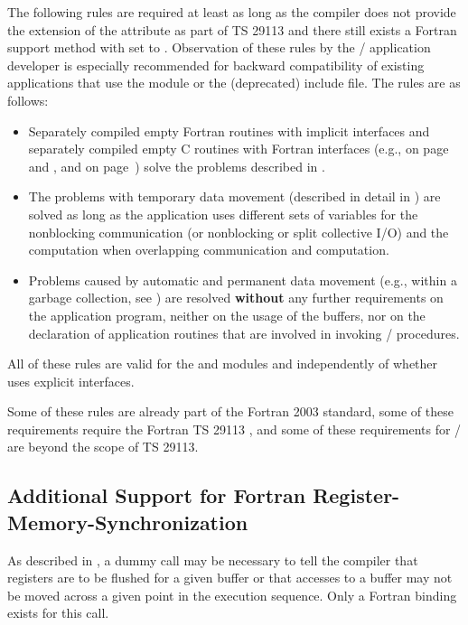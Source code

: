 The following rules are required at least as long as the compiler does not provide
the extension of the  attribute as part of
TS 29113
and there still exists a Fortran support method with
 set to .
Observation of these rules by the \MPI/ application developer is
especially recommended for
backward compatibility of existing applications that
use the  module or the (deprecated)  include file.
The rules are as follows:
\begin{itemize}
\item
  Separately compiled empty Fortran routines with implicit interfaces
  and separately compiled empty C routines with  Fortran interfaces
  (e.g., 
   on page~\pageref{sec:f90-problems:code-movements:f-sync-reg}
   and ,
   and 
   on page~\pageref{sec:f90-problems:code-movements:dd})
  solve the problems described in
  .
\item
  The problems with temporary data movement
  (described in detail in )
  are solved as long as the application uses different sets
  of variables for
  the nonblocking communication (or nonblocking or split collective I/O)
  and the computation when overlapping communication and computation.
\item
  Problems caused by automatic and permanent data movement
  (e.g., within a garbage collection, see
  )
  are resolved \textbf{without} any further requirements
  on the application program, neither on the usage of the buffers,
  nor on the declaration of application routines that are involved
  in invoking \MPI/ procedures.
\end{itemize}
All of these rules are valid
for the  and 
modules and
independently of whether
 uses explicit interfaces.
\begin{implementors}
   Some of these rules are already part of the Fortran 2003 standard,
   some of these requirements require
   the Fortran TS 29113
   \cite{fortran2008:ts29113-interop},
   and
   some of these requirements for \MPI/ are beyond the scope of TS 29113.
\end{implementors}


\subsection{Additional Support for Fortran Register-Memory-Synchronization}
\label{f90:syncreg}
As described in ,
a dummy call may be necessary to tell the compiler that registers
are to be flushed for a given buffer
or that accesses to a buffer may not be moved across a given point in the execution sequence.
Only a Fortran binding exists for this call.

